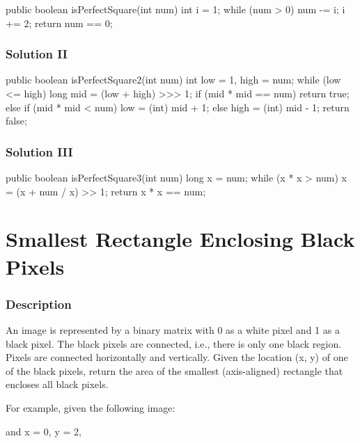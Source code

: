 \begin{Code}
public boolean isPerfectSquare(int num) {
    int i = 1;
    while (num > 0) {
        num -= i;
        i += 2;
    }
    return num == 0;
}
\end{Code}

\subsubsection{Solution II}
\begin{Code}
public boolean isPerfectSquare2(int num) {
    int low = 1, high = num;
    while (low <= high) {
        long mid = (low + high) >>> 1;
        if (mid * mid == num) {
            return true;
        } else if (mid * mid < num) {
            low = (int) mid + 1;
        } else {
            high = (int) mid - 1;
        }
    }
    return false;
}
\end{Code}
\subsubsection{Solution III}
\begin{Code}
public boolean isPerfectSquare3(int num) {
    long x = num;
    while (x * x > num) {
        x = (x + num / x) >> 1;
    }
    return x * x == num;
}
\end{Code}

\newpage

\section{Smallest Rectangle Enclosing Black Pixels} %

\subsubsection{Description}
An image is represented by a binary matrix with 0 as a white pixel and 1 as a black pixel. The black pixels are connected, i.e., there is only one black region. Pixels are connected horizontally and vertically. Given the location (x, y) of one of the black pixels, return the area of the smallest (axis-aligned) rectangle that encloses all black pixels.

For example, given the following image:
\begin{Code}
[
  "0010",
  "0110",
  "0100"
]
\end{Code}

and x = 0, y = 2,

